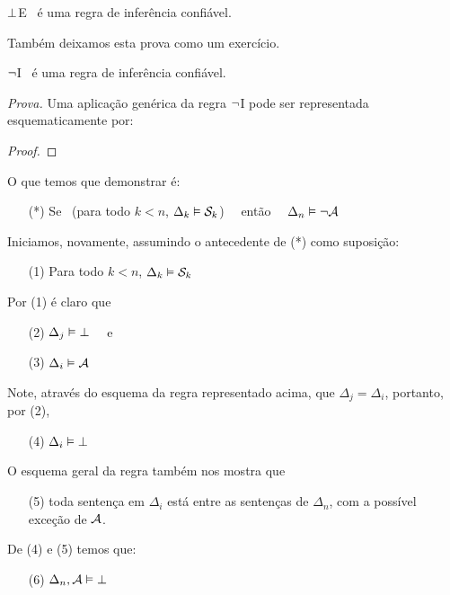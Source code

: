 \begin{factoidboxe}
	$\bot$E  \ é uma regra de inferência confiável.
\end{factoidboxe}

Também deixamos esta prova como um exercício.

\begin{factoidboxe}
	$\neg$I \ é uma regra de inferência confiável.
\end{factoidboxe}
\noindent\emph{Prova.}
	Uma aplicação genérica da regra $\neg$I pode ser representada esquematicamente por:
\begin{proof}
   \open
   \close
\end{proof}\noindent
O que temos que demonstrar é:
\begin{itemize}
	\item[(*)]  Se  \ ({para todo}  $k<n$, $\Delta_k \vDash \mathcal{S}_k$) \ \ então \ \ $\Delta_n \vDash \neg\mathcal{A}$
\end{itemize}
Iniciamos, novamente, assumindo o antecedente de (*) como suposição:
\begin{itemize}
	\item[(1)] Para todo  $k<n$, $\Delta_k \vDash \mathcal{S}_k$
\end{itemize}
Por (1) é claro que
\begin{itemize}
	\item[(2)] $\Delta_j \vDash \bot$ \ \ e
\end{itemize}
\begin{itemize}
	\item[(3)] $\Delta_i \vDash \mathcal{A}$
\end{itemize}
Note, através do esquema da regra representado acima, que $\Delta_j=\Delta_i$, portanto, por (2),
\begin{itemize}
	\item[(4)] $\Delta_i \vDash \bot$
\end{itemize}
O esquema geral da regra também nos mostra que
\begin{itemize}
 	\item[(5)] toda sentença em $\Delta_i$ está entre as sentenças de $\Delta_n$, com a possível exceção de $\mathcal{A}$.
\end{itemize}
De (4) e (5) temos que:
\begin{itemize}
	\item[(6)] $\Delta_n, \mathcal{A} \vDash \bot$
\end{itemize}

